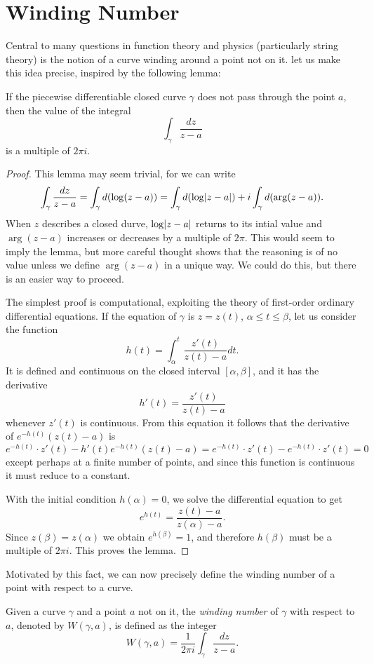 \section{Winding Number}
Central to many questions in function theory and physics (particularly string theory) is the notion of a curve winding around a point not on it. let us make this idea precise, inspired by the following lemma:
\begin{lemma}
If the piecewise differentiable closed curve $\gamma$ does not pass through the point $a$, then the value of the integral $$\int_{\gamma} \dfrac{dz}{z-a}$$ is a multiple of $2\pi i$.
\end{lemma}
\begin{proof}
This lemma may seem trivial, for we can write $$\int_{\gamma}\dfrac{dz}{z-a}=\int_{\gamma} d(\log(z-a))=\int_{\gamma}d(\log \lvert z-a \rvert)+i\int_{\gamma}d(\arg(z-a)).$$ When $z$ describes a closed durve, $\log\lvert z-a \rvert$ returns to its intial value and $\arg(z-a)$ increases or decreases by a multiple of $2\pi$. This would seem to imply the lemma, but more careful thought shows that the reasoning is of no value unless we define $\arg(z-a)$ in a unique way. We could do this, but there is an easier way to proceed.

The simplest proof is computational, exploiting the theory of first-order ordinary differential equations. If the equation of $\gamma$ is $z=z(t)$, $\alpha \le t \le \beta$, let us consider the function $$h(t)=\int_{\alpha}^{t}\dfrac{z'(t)}{z(t)-a}dt.$$ It is defined and continuous on the closed interval $[\alpha, \beta]$, and it has the derivative $$h'(t)=\dfrac{z'(t)}{z(t)-a}$$ whenever $z'(t)$ is continuous. From this equation it follows that the derivative of $e^{-h(t)}(z(t)-a)$ is $$e^{-h(t)} \cdot z'(t)-h'(t)e^{-h(t)}(z(t)-a)=e^{-h(t)} \cdot z'(t)-e^{-h(t)} \cdot z'(t)=0$$ except perhaps at a finite number of points, and since this function is continuous it must reduce to a constant.

With the initial condition $h(\alpha)=0$, we solve the differential equation to get $$e^{h(t)}=\dfrac{z(t)-a}{z(\alpha)-a}.$$ Since $z(\beta)=z(\alpha)$ we obtain $e^{h(\beta)}=1$, and therefore $h(\beta)$ must be a multiple of $2\pi i$. This proves the lemma.
\end{proof}

Motivated by this fact, we can now precisely define the winding number of a point with respect to a curve.

\begin{definition}
Given a curve $\gamma$ and a point $a$ not on it, the \emph{winding number} of $\gamma$ with respect to $a$, denoted by $W(\gamma, a)$, is defined as the integer $$W(\gamma, a)=\frac{1}{2\pi i}\int_{\gamma} \dfrac{dz}{z-a}.$$
\end{definition}

